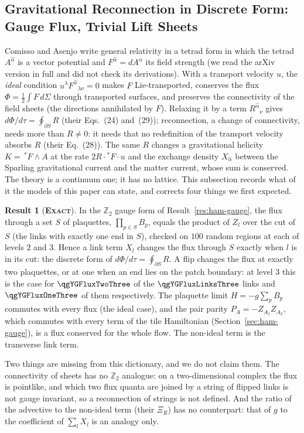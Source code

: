 \documentclass[11pt]{article}
\newcommand{\exact}{\textbf{\textsc{Exact}}}
\theoremstyle{definition}
\newtheorem{result}{Result}
\begin{document}
\subsection{Gravitational Reconnection in Discrete Form: Gauge Flux, Trivial Lift Sheets}
\label{sec:toward-reconnect}

Comisso and Asenjo \cite{comisso2026} write general relativity in a tetrad form in which the tetrad $A^{\hat\alpha}$ is a vector potential and $F^{\hat\alpha}=dA^{\hat\alpha}$ its field strength (we read the arXiv version in full and did not check its derivations). With a transport velocity $u$, the \emph{ideal} condition $u^\lambda F^{\hat\alpha}{}_{\lambda\nu}=0$ makes $F$ Lie-transported, conserves the flux $\Phi=\tfrac12\int F\,d\Sigma$ through transported surfaces, and preserves the connectivity of the field sheets (the directions annihilated by $F$). Relaxing it by a term $R^{\hat\alpha}{}_\nu$ gives $d\Phi/d\tau=\oint_{\partial S}R$ (their Eqs.~(24) and~(29)); reconnection, a change of connectivity, needs more than $R\neq0$: it needs that no redefinition of the transport velocity absorbs $R$ (their Eq.~(28)). The same $R$ changes a gravitational helicity $K=\,^*F\!\wedge A$ at the rate $2R\cdot{}^*F\cdot u$ and the exchange density $X_{\hat\alpha}$ between the Sparling gravitational current and the matter current, whose sum is conserved. The theory is a continuum one; it has no lattice. This subsection records what of it the models of this paper can state, and corrects four things we first expected.

\begin{result}[\exact]\label{res:flux-transfer}
In the $\mathbb{Z}_2$ gauge form of Result~\ref{res:ham-gauge}, the flux through a set $S$ of plaquettes, $\prod_{p\in S}B_p$, equals the product of $Z_l$ over the cut of $S$ (the links with exactly one end in $S$), checked on $100$ random regions at each of levels $2$ and $3$. Hence a link term $X_l$ changes the flux through $S$ exactly when $l$ is in its cut: the discrete form of $d\Phi/d\tau=\oint_{\partial S}R$. A flip changes the flux at exactly two plaquettes, or at one when an end lies on the patch boundary: at level $3$ this is the case for $\qgYGFluxTwoThree$ of the $\qgYGFluxLinksThree$ links and $\qgYGFluxOneThree$ of them respectively. The plaquette limit $H=-g\sum_pB_p$ commutes with every flux (the ideal case), and the pair parity $P_A=-Z_{A_1}Z_{A_2}$, which commutes with every term of the tile Hamiltonian (Section~\ref{sec:ham-gauge}), is a flux conserved for the whole flow. The non-ideal term is the transverse link term.
\end{result}
Two things are missing from this dictionary, and we do not claim them. The connectivity of sheets has no $\mathbb{Z}_2$ analogue: on a two-dimensional complex the flux is pointlike, and which two flux quanta are joined by a string of flipped links is not gauge invariant, so a reconnection of strings is not defined. And the ratio of the advective to the non-ideal term (their $\Xi_R$) has no counterpart: that of $g$ to the coefficient of $\sum_lX_l$ is an analogy only.
\end{document}
